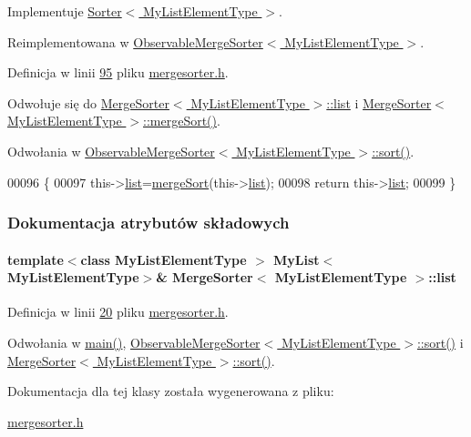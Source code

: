 Implementuje \hyperlink{class_sorter_a4a82d8151d6172802d1e60cb30c7d7d3}{Sorter$<$ My\-List\-Element\-Type $>$}.



Reimplementowana w \hyperlink{class_observable_merge_sorter_ac845eed6758733f3935ffb5aa0b5f64a}{Observable\-Merge\-Sorter$<$ My\-List\-Element\-Type $>$}.



Definicja w linii \hyperlink{mergesorter_8h_source_l00095}{95} pliku \hyperlink{mergesorter_8h_source}{mergesorter.\-h}.



Odwołuje się do \hyperlink{mergesorter_8h_source_l00020}{Merge\-Sorter$<$ My\-List\-Element\-Type $>$\-::list} i \hyperlink{mergesorter_8h_source_l00073}{Merge\-Sorter$<$ My\-List\-Element\-Type $>$\-::merge\-Sort()}.



Odwołania w \hyperlink{observablemergesorter_8h_source_l00026}{Observable\-Merge\-Sorter$<$ My\-List\-Element\-Type $>$\-::sort()}.


\begin{DoxyCode}
00096         \{
00097                 this->\hyperlink{class_merge_sorter_a8ac3ee938414809d7da627cf918f1f87}{list}=\hyperlink{class_merge_sorter_ab945fd9934a6f47a851b40b23d18ee71}{mergeSort}(this->\hyperlink{class_merge_sorter_a8ac3ee938414809d7da627cf918f1f87}{list});
00098                 \textcolor{keywordflow}{return} this->\hyperlink{class_merge_sorter_a8ac3ee938414809d7da627cf918f1f87}{list};
00099         \}
\end{DoxyCode}


\subsubsection{Dokumentacja atrybutów składowych}
\hypertarget{class_merge_sorter_a8ac3ee938414809d7da627cf918f1f87}{
\paragraph[{list}]{\setlength{\rightskip}{0pt plus 5cm}template$<$class My\-List\-Element\-Type $>$ {\bf My\-List}$<$My\-List\-Element\-Type$>$\& {\bf Merge\-Sorter}$<$ My\-List\-Element\-Type $>$\-::list}}\label{class_merge_sorter_a8ac3ee938414809d7da627cf918f1f87}


Definicja w linii \hyperlink{mergesorter_8h_source_l00020}{20} pliku \hyperlink{mergesorter_8h_source}{mergesorter.\-h}.



Odwołania w \hyperlink{main_8cpp_source_l00022}{main()}, \hyperlink{observablemergesorter_8h_source_l00026}{Observable\-Merge\-Sorter$<$ My\-List\-Element\-Type $>$\-::sort()} i \hyperlink{mergesorter_8h_source_l00095}{Merge\-Sorter$<$ My\-List\-Element\-Type $>$\-::sort()}.



Dokumentacja dla tej klasy została wygenerowana z pliku\-:\begin{DoxyCompactItemize}
\item 
\hyperlink{mergesorter_8h}{mergesorter.\-h}\end{DoxyCompactItemize}
